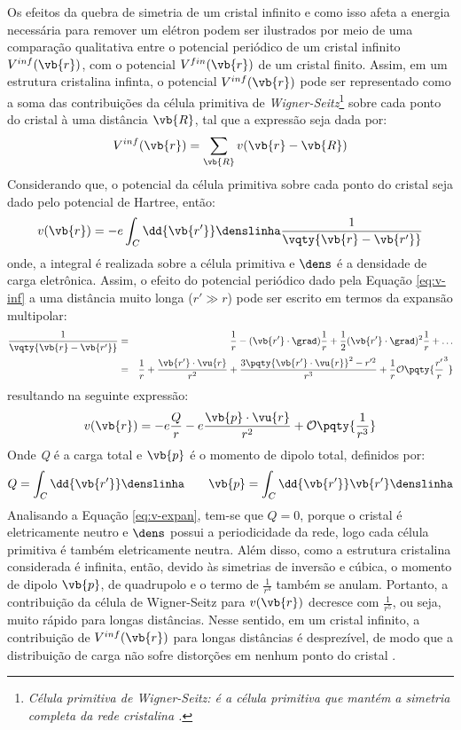 Os efeitos da quebra de simetria de um cristal infinito e como isso afeta a energia necessária para remover um elétron podem ser ilustrados por meio de uma comparação qualitativa entre o potencial periódico de um cristal infinito $V^{inf}(\vb{r}) $, com o potencial $ V^{fin}(\vb{r}) $ de um cristal finito. Assim, em um estrutura cristalina infinta, o potencial $ V^{inf}(\vb{r}) $ pode ser representado como a soma das contribuições da célula primitiva de \textit{Wigner-Seitz}\footnote{\textit{Célula primitiva de Wigner-Seitz: é a célula primitiva que mantém a simetria completa da rede cristalina \cite{estado-solido2}.}} sobre cada ponto do cristal à uma distância $ \vb{R} $, tal que a expressão seja dada por: 
\begin{equation}\label{eq:v-inf}
	V^{inf}(\vb{r})=\sum_{\vb{R}}v(\vb{r}-\vb{R})
\end{equation}
Considerando que, o potencial da célula primitiva sobre cada ponto do cristal seja dado pelo potencial de Hartree, então:
\begin{equation}
	v(\vb{r})=-e\int_C \dd{\vb{r'}}\denslinha\frac{1}{\vqty{\vb{r}-\vb{r'}}}
\end{equation}
onde, a integral é realizada sobre a célula primitiva e $ \dens $ é a densidade de carga eletrônica. Assim, o efeito do potencial periódico dado pela Equação \eqref{eq:v-inf} a uma distância muito longa ($ r'\gg r $) pode ser escrito em termos da expansão multipolar:
\begin{eqnarray}
	\frac{1}{\vqty{\vb{r}-\vb{r'}}}&=&\frac{1}{r}-(\vb{r'}\cdot\grad)\frac{1}{r}+\frac{1}{2}(\vb{r'}\cdot\grad)^2\frac{1}{r}+\ldots \nonumber\\ &=&\frac{1}{r}+\frac{\vb{r'}\cdot\vu{r}}{r^2}+\frac{3\pqty{\vb{r'}\cdot\vu{r}}^2-r'^2}{r^3}+\frac{1}{r}\mathcal{O}\pqty{\frac{r'}{r}^3}
\end{eqnarray}
resultando na seguinte expressão:
\begin{equation}\label{eq:v-expan}
	v(\vb{r})=-e\frac{Q}{r}-e\frac{\vb{p}\cdot\vu{r}}{r^2}+\mathcal{O}\pqty{\frac{1}{r^3}}
\end{equation}
Onde \textit{Q} é a carga total e $ \vb{p} $ é o momento de dipolo total, definidos por:
\begin{equation}
	Q=\int_{C}\dd{\vb{r'}}\denslinha\qquad \vb{p}=\int_{C}\dd{\vb{r'}}\vb{r'}\denslinha
\end{equation}
Analisando a Equação \eqref{eq:v-expan}, tem-se que $ Q=0 $, porque o cristal é eletricamente neutro e $ \dens $ possui a periodicidade da rede, logo cada célula primitiva é também eletricamente neutra. Além disso, como a estrutura cristalina considerada é infinita, então, devido às simetrias de inversão e cúbica, o momento de dipolo $ \vb{p} $, de quadrupolo e o termo de $ \frac{1}{r^4}$ também se anulam. Portanto, a contribuição da célula de Wigner-Seitz para $ v(\vb{r}) $ decresce com $ \frac{1}{r^5} $, ou seja, muito rápido para longas distâncias. Nesse sentido, em um cristal infinito, a contribuição de $ V^{inf}(\vb{r}) $ para longas distâncias é desprezível, de modo que a distribuição de carga não sofre distorções em nenhum ponto do cristal \cite{ashcroft}. 

